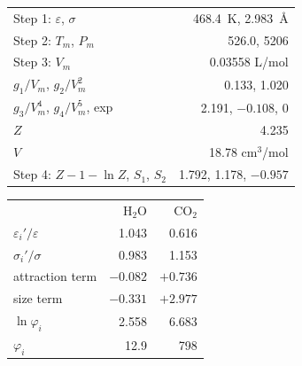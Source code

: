 \documentclass[11pt]{article}
\begin{document}
{\begin{minipage}[t]{0.37\linewidth}
\smallskip
\begin{tabular}{@{}l r@{}}
  Step 1: $\varepsilon$, $\sigma$               & 468.4~K, 2.983~\AA \\
  Step 2: $T_m$, $P_m$                          & 526.0, 5206        \\
  Step 3: $V_m$                                 & 0.03558 L/mol      \\
  \quad $g_1/V_m$, $g_2/V_m^2$                  & 0.133, 1.020       \\
  \quad $g_3/V_m^4$, $g_4/V_m^5$, exp           & 2.191, $-0.108$, 0 \\
  \quad $Z$                                     & 4.235              \\
  \quad $V$                                     & 18.78 cm$^3$/mol   \\
  Step 4: $Z-1-\ln Z$, $S_1$, $S_2$             & 1.792, 1.178, $-0.957$ \\
\end{tabular}

\smallskip
\begin{tabular}{@{}l r r@{}}
                                                & H$_2$O   & CO$_2$  \\
  $\varepsilon_i'/\varepsilon$                  & 1.043    & 0.616   \\
  $\sigma_i'/\sigma$                            & 0.983    & 1.153   \\
  attraction term                               & $-0.082$ & $+0.736$ \\
  size term                                     & $-0.331$ & $+2.977$ \\
  $\ln\varphi_i$                                & 2.558    & 6.683   \\
  $\varphi_i$                                   & 12.9     & 798     \\
\end{tabular}
\end{minipage}

}

\clearpage
\end{document}
